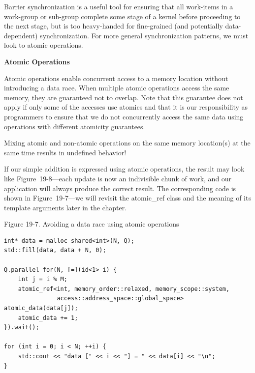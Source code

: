 Barrier synchronization is a useful tool for ensuring that all work-items in a work-group or sub-group complete some stage of a kernel before proceeding to the next stage, but is too heavy-handed for fine-grained (and potentially data-dependent) synchronization. For more general synchronization patterns, we must look to atomic operations.\par

\hspace*{\fill} \par %
\textbf{Atomic Operations}

Atomic operations enable concurrent access to a memory location without introducing a data race. When multiple atomic operations access the same memory, they are guaranteed not to overlap. Note that this guarantee does not apply if only some of the accesses use atomics and that it is our responsibility as programmers to ensure that we do not concurrently access the same data using operations with different atomicity guarantees.\par

\begin{tcolorbox}[colback=red!5!white,colframe=red!75!black]
Mixing atomic and non-atomic operations on the same memory location(s) at the same time results in undefined behavior!
\end{tcolorbox}

If our simple addition is expressed using atomic operations, the result may look like Figure 19-8—each update is now an indivisible chunk of work, and our application will always produce the correct result. The corresponding code is shown in Figure 19-7—we will revisit the atomic\_ref class and the meaning of its template arguments later in the chapter.\par

\hspace*{\fill} \par %
Figure 19-7. Avoiding a data race using atomic operations
\begin{lstlisting}[caption={}]
int* data = malloc_shared<int>(N, Q);
std::fill(data, data + N, 0);

Q.parallel_for(N, [=](id<1> i) {
	int j = i % M;
	atomic_ref<int, memory_order::relaxed, memory_scope::system,
			   access::address_space::global_space> atomic_data(data[j]);
	atomic_data += 1;
}).wait();

for (int i = 0; i < N; ++i) {
	std::cout << "data [" << i << "] = " << data[i] << "\n";
}
\end{lstlisting}

